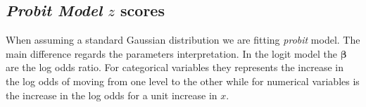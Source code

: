 \documentclass[
  man,floatsintext]{apa6}
\newenvironment{Shaded}{\begin{snugshade}}{\end{snugshade}}
\newcommand{\AttributeTok}[1]{\textcolor[rgb]{0.13,0.29,0.53}{#1}}
\newcommand{\CommentTok}[1]{\textcolor[rgb]{0.56,0.35,0.01}{\textit{#1}}}
\newcommand{\DecValTok}[1]{\textcolor[rgb]{0.00,0.00,0.81}{#1}}
\newcommand{\FunctionTok}[1]{\textcolor[rgb]{0.13,0.29,0.53}{\textbf{#1}}}
\newcommand{\NormalTok}[1]{#1}
\newcommand{\OtherTok}[1]{\textcolor[rgb]{0.56,0.35,0.01}{#1}}
\newcommand{\SpecialCharTok}[1]{\textcolor[rgb]{0.81,0.36,0.00}{\textbf{#1}}}
\newcommand{\StringTok}[1]{\textcolor[rgb]{0.31,0.60,0.02}{#1}}
\begin{document}
\begin{Shaded}
\end{Shaded}

\normalsize

\subsection{\texorpdfstring{\emph{Probit Model} \(z\) scores}{Probit Model z scores}}\label{probit-model-z-scores}

When assuming a standard Gaussian distribution we are fitting \emph{probit} model. The main difference regards the parameters interpretation. In the logit model the \(\boldsymbol{\beta}\) are the log odds ratio. For categorical variables they represents the increase in the log odds of moving from one level to the other while for numerical variables is the increase in the log odds for a unit increase in \(x\).
\end{document}
